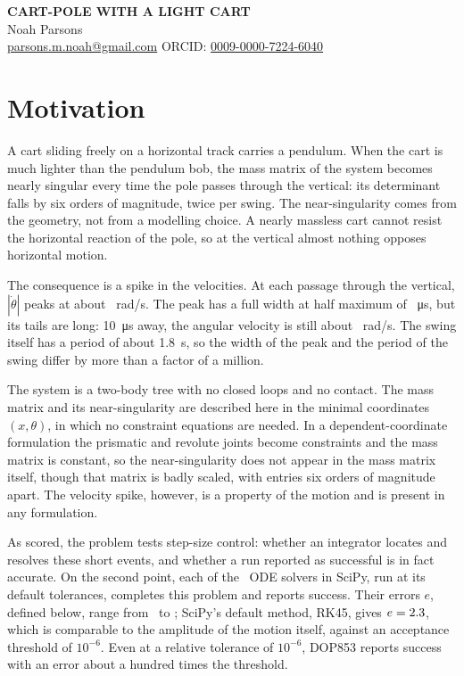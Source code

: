 \documentclass[11pt,a4paper]{article}
\begin{document}
\begin{center}
{\Large\bfseries CART-POLE WITH A LIGHT CART}\\[0.4em]
Noah Parsons\\[0.2em]
{\small \href{mailto:parsons.m.noah@gmail.com}{parsons.m.noah@gmail.com}
\quad ORCID: \href{https://orcid.org/0009-0000-7224-6040}{0009-0000-7224-6040}}
\end{center}

\section*{Motivation}

A cart sliding freely on a horizontal track carries a pendulum. When the cart is
much lighter than the pendulum bob, the mass matrix of the system becomes nearly
singular every time the pole passes through the vertical: its determinant falls by
six orders of magnitude, twice per swing. The near-singularity comes from the
geometry, not from a modelling choice. A nearly massless cart cannot resist the
horizontal reaction of the pole, so at the vertical almost nothing opposes
horizontal motion.

The consequence is a spike in the velocities. At each passage through the
vertical, $|\dot\theta|$ peaks at about \Peak~rad/s. The peak has a full width at
half maximum of \Fwhm~\si{\micro\second}, but its tails are long: \SI{10}{\micro\second}
away, the angular velocity is still about \Tail~rad/s. The swing itself has a period
of about \SI{1.8}{\second}, so the width of the peak and the period of the swing
differ by more than a factor of a million.

The system is a two-body tree with no closed loops and no contact. The mass matrix
and its near-singularity are described here in the minimal coordinates $(x,\theta)$,
in which no constraint equations are needed. In a dependent-coordinate formulation
the prismatic and revolute joints become constraints and the mass matrix is
constant, so the near-singularity does not appear in the mass matrix itself, though
that matrix is badly scaled, with entries six orders of magnitude apart. The
velocity spike, however, is a property of the motion and is present in any
formulation.

As scored, the problem tests step-size control: whether an integrator locates and
resolves these short events, and whether a run reported as successful is in fact
accurate. On the second point, each of the \NSolvers\ ODE solvers in SciPy, run at its
default tolerances, completes this problem and reports success. Their errors $e$,
defined below, range from \EDefaultMin\ to \EDefaultMax; SciPy's default method,
RK45, gives $e = 2.3$, which is comparable to the amplitude of the motion
itself, against an acceptance threshold of $10^{-6}$. Even at a relative tolerance
of $10^{-6}$, DOP853 reports success with an error about a hundred times the
threshold.
\end{document}
